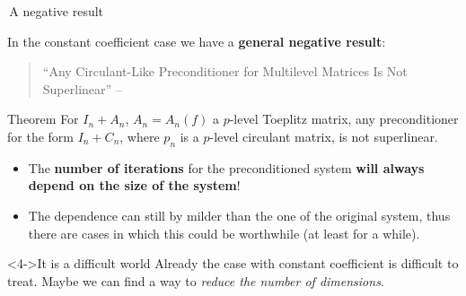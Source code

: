 \documentclass[aspectratio=169,xcolor=dvipsnames]{beamer}
\begin{document}
	\begin{frame}{\faSadTear\,A negative result}
		
	In the constant coefficient case we have a \textbf{general negative result}:
	\begin{quote}
		``Any Circulant-Like Preconditioner for Multilevel
		Matrices Is Not Superlinear'' -- \cite{MR1718339}
	\end{quote}

	\begin{alertblock}{Theorem \parencite[Theorem~4.1]{MR1718339}}
	For $I_n + A_n$, $A_n = A_n(f)$ a $p$-level Toeplitz matrix, any preconditioner for the form $I_n + C_n$, where $p_n$ is a $p$-level circulant matrix, is not superlinear.
	\end{alertblock}

	\begin{itemize}
		\item[\alert{\faBomb}]<2-> The \textbf{number of iterations} for the preconditioned system \textbf{will always depend on the size of the system}!
		\item[\faHammer]<3-> The dependence can still by milder than the one of the original system, thus there are cases in which this could be worthwhile (at least for a while).
	\end{itemize}\vspace{-0.5em}
	\begin{exampleblock}<4->{It is a difficult world}
	Already the case with constant coefficient is difficult to treat. Maybe we can find a way to \emph{reduce the number of dimensions}.
	\end{exampleblock}
	
	\end{frame}
\end{document}
